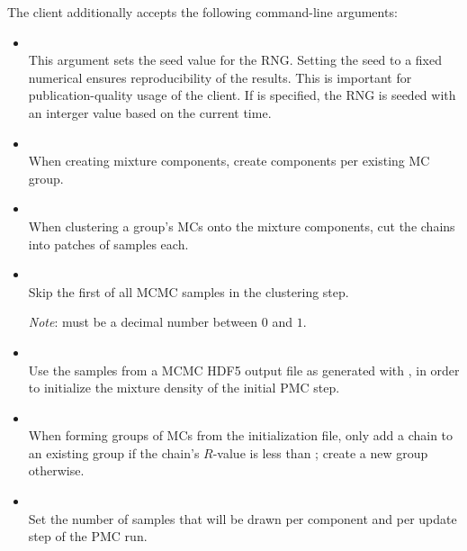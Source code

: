 The  client additionally accepts the following command-line arguments:
\begin{itemize}
    \item[] \\[\medskipamount]
        This argument sets the seed value for the \gls{RNG}. Setting the
        seed to a fixed numerical  ensures reproducibility of the results. This
        is important for publication-quality usage of the client. If  is
        specified, the \gls{RNG} is seeded with an interger value based on the current time.

    \item[] \\[\medskipamount]
        When creating mixture components, create  components per existing
        MC group.

    \item[] \\[\medskipamount]
        When clustering a group's MCs onto the mixture components, cut the
        chains into patches of  samples each.

    \item[] \\[\medskipamount]
        Skip the first  of all MCMC samples in the clustering step.

        \emph{Note}:  must be a decimal number between $0$ and $1$.

    \item[] \\[\medskipamount]
        Use the samples from a MCMC HDF5 output file  as
        generated with , in order to initialize the
        mixture density of the initial PMC step.

    \item[] \\[\medskipamount]
        When forming groups of MCs from the initialization file, only add
        a chain to an existing group if the chain's $R$-value is less than ;
        create a new group otherwise.

    \item[] \\[\medskipamount]
        Set the number  of samples that will be drawn per component and
        per update step of the PMC run.


\end{itemize}

